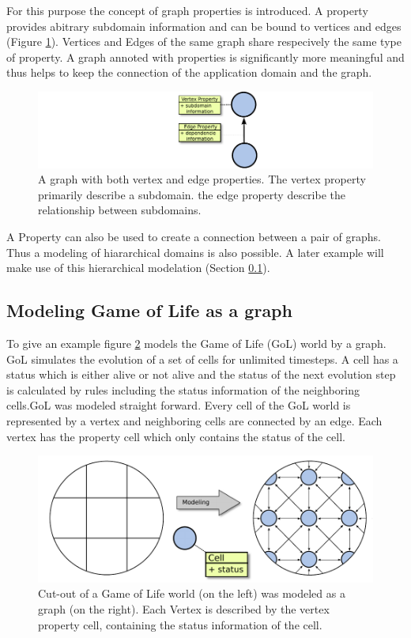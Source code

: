 For this purpose the concept of graph properties is introduced. A
property provides abitrary subdomain information and can be bound to
vertices and edges (Figure \ref{fig:property}). Vertices and Edges of
the same graph share respecively the same type of property. A graph
annoted with properties is significantly more meaningful and thus
helps to keep the connection of the application domain and the graph.

\begin{figure}[H]
  \centering \includegraphics[width=\textwidth]{graphics/30_property}
  \caption{A graph with both vertex and edge properties. The vertex
    property primarily describe a subdomain. the edge property
    describe the relationship between subdomains.}
  \label{fig:property}
\end{figure}

A Property can also be used to create a connection between a pair of
graphs. Thus a modeling of hiararchical domains is also possible.  A
later example will make use of this hierarchical modelation (Section
\ref{sec:gol}).


\subsection{Modeling Game of Life as a graph}
\label{sec:gol}
To give an example figure \ref{fig:gol} models the Game of Life (GoL)
\cite{ref:gol} world by a graph. GoL simulates the evolution of a set
of cells for unlimited timesteps. A cell has a status which is either
alive or not alive and the status of the next evolution step is
calculated by rules including the status information of the
neighboring cells.GoL was modeled straight forward.  Every cell of the
GoL world is represented by a vertex and neighboring cells are
connected by an edge. Each vertex has the property cell which only
contains the status of the cell.

\begin{figure}[H]
  \centering \includegraphics[width=\textwidth]{graphics/30_gol}
  \caption{Cut-out of a Game of Life world (on the left) was modeled
    as a graph (on the right). Each Vertex is described by the vertex
    property cell, containing the status information of the cell.}
  \label{fig:gol}
\end{figure}

